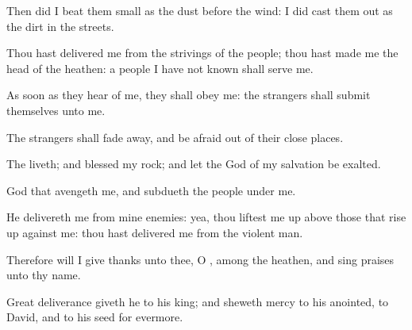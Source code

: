 {\par }{\Q {}Then did I
beat them small as the
dust
before the
wind: I did cast them
out as the
dirt in the
streets.


\par }{\Q {}Thou hast
delivered me from the
strivings of the
people;
{} thou hast
made me the
head of the
heathen: a
people
{} I have not
known shall
serve me.


\par }{\Q {}As soon as they
hear of me, they shall
obey me: the
strangers shall
submit themselves unto me.


\par }{\Q {}The
strangers shall fade
away, and be
afraid out of their close
places.


\par }{\Q {}The
{}
liveth; and
blessed
{} my
rock; and let the
God of my
salvation be
exalted.


\par }{\Q {}
God that
avengeth me, and
subdueth the
people under me.


\par }{\Q {}He
delivereth me from mine
enemies: yea, thou liftest me
up above those that rise
up against me: thou hast
delivered me from the
violent
man.


\par }{\Q {}Therefore will I give
thanks unto thee, O
{}, among the
heathen, and sing
praises unto thy
name.


\par }{\Q {}Great
deliverance giveth he to his
king; and
sheweth
mercy to his
anointed, to
David, and to his
seed
for
evermore.




\par }
